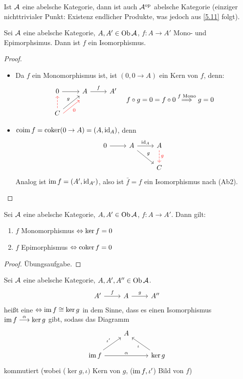 \begin{anm}
	Ist $\mathcal{A}$ eine abelsche Kategorie, dann ist auch $\mathcal{A}^\text{op}$ abelsche Kategorie (einziger nichttrivialer Punkt: Existenz endlicher Produkte, was jedoch aus \ref{5.11} folgt).
\end{anm}
\begin{sa}\label{5.23}
	Sei $\mathcal{A}$ eine abelsche Kategorie, $A,A' \in \text{Ob}\,\mathcal{A}$, $f:A \to A'$ Mono- und Epimorphsimus. Dann ist $f$ ein Isomorphismus.
\end{sa}
\begin{proof}
	\begin{itemize}
		\item Da $f$ ein Monomorphismus ist, ist $(0, 0 \to A)$ ein Kern von $f$, denn: 
		$$ \begin{tikzcd}
		0 \arrow{r} & A \arrow{r}{f} & A' \\
		C \arrow[dashed, red]{u}\arrow{ur}{g} \arrow[swap, red, yshift = -1.5ex]{ur}{0}& & 
		\end{tikzcd} \quad f\circ g = 0 = f \circ 0 \overset{f \text{ Mono}}{\Longrightarrow} g=0
		$$
		\item $\operatorname{coim} f = \operatorname{coker}(0 \to A) = (A, \operatorname{id}_A)$, denn 
		$$\begin{tikzcd}
		0 \arrow{r} & A \arrow{dr}{g} \arrow{r}{\id_A} & A \arrow[red, dashed]{d}{g}\\
		& & C
		\end{tikzcd}
		$$
		Analog ist $\operatorname{im} f = (A', \operatorname{id}_{A'})$, also ist $\bar f = f $ ein Isomorphismus nach (Ab2).
	\end{itemize}
\end{proof}
\begin{bem}\label{5.24}
	Sei $\mathcal{A}$ eine abelsche Kategorie, $A,A' \in \text{Ob}\,\mathcal{A}$, $f:A \to A'$. Dann gilt:
	\begin{enumerate}[label= \alph*)]
		\item $f$ Monomorphismus $\Leftrightarrow \ker f =0$
		\item $f$ Epimorphismus $\Leftrightarrow \operatorname{coker} f = 0$
	\end{enumerate}
\end{bem}
\begin{proof}
	Übungsaufgabe.
\end{proof}
\begin{df}\label{5.25}
	Sei $\mathcal{A}$ eine abelsche Kategorie, $A,A', A''\in \text{Ob}\,\mathcal{A}$.
	$$\begin{tikzcd}
	A' \arrow{r}{f} & A \arrow{r}{g} & A''
	\end{tikzcd}$$
	heißt eine  $\Leftrightarrow \operatorname{im} f \cong \ker g$ in dem Sinne, dass es einen Isomorphismus
	$\operatorname{im} f \overset{\alpha}{\longrightarrow} \ker g$ gibt, sodass das Diagramm
	$$\begin{tikzcd}
	& A & \\
	\im f \arrow{ur}{\iota'} \arrow{rr}{\alpha} & & \ker g \arrow{ul}{\iota}
	\end{tikzcd}$$
	kommutiert (wobei ($\ker g, \iota)$ Kern von $g$, ($\operatorname{im} f, \iota'$) Bild von $f$)
\end{df}
